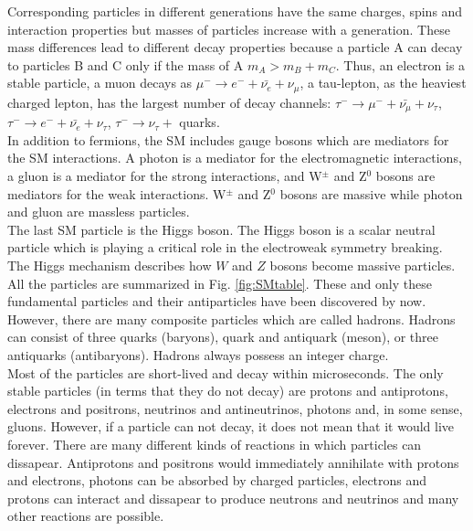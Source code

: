 Corresponding particles in different generations have the same charges, spins and interaction properties but masses of particles increase with a generation. These mass differences lead to different decay properties because a particle A can decay to particles B and C only if the mass of A $m_A > m_B + m_C$. Thus, an electron is a stable particle, a muon decays as $\mu^- \rightarrow e^- + \bar{\nu_e} + \nu_\mu$, a tau-lepton, as the heaviest charged lepton, has the largest number of decay channels: $\tau^- \rightarrow \mu^- + \bar{\nu_\mu} + \nu_\tau$, $\tau^- \rightarrow e^- + \bar{\nu_e} + \nu_\tau$,  $\tau^- \rightarrow \nu_\tau +$ quarks. \\

In addition to fermions, the SM includes gauge bosons which are mediators for the SM interactions. A photon is a mediator for the electromagnetic interactions,  a gluon is a mediator for the strong interactions, and W$^{\pm}$ and Z$^0$ bosons are mediators for the weak interactions. W$^{\pm}$ and Z$^0$ bosons are massive while photon and gluon are massless particles. \\

The last SM particle is the Higgs boson. The Higgs boson is a scalar neutral particle which is playing a critical role in the electroweak symmetry breaking. The Higgs mechanism describes how $W$ and $Z$ bosons become massive particles.\\

All the particles are summarized in Fig. \ref{fig:SMtable}. These and only these fundamental particles and their antiparticles have been discovered by now. However, there are many composite particles which are called hadrons. Hadrons can consist of three quarks (baryons), quark and antiquark (meson), or three antiquarks (antibaryons). Hadrons always possess an integer charge.\\

Most of the particles are short-lived and decay within microseconds. The only stable particles (in terms that they do not decay) are protons and antiprotons, electrons and positrons, neutrinos and antineutrinos, photons and, in some sense, gluons. However, if a particle can not decay, it does not mean that it would live forever. There are many different kinds of reactions in which particles can dissapear. Antiprotons and positrons would immediately annihilate with protons and electrons, photons can be absorbed by charged particles, electrons and protons can interact and dissapear to produce neutrons and neutrinos and many other reactions are possible.\\ 

